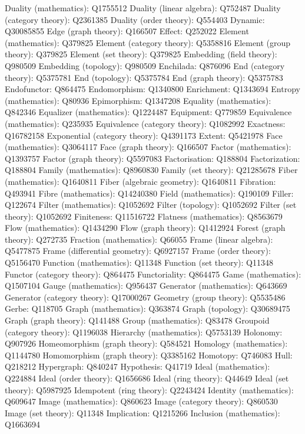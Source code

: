 Duality (mathematics): Q1755512
Duality (linear algebra): Q752487
Duality (category theory): Q2361385
Duality (order theory): Q554403
Dynamic: Q30085855
Edge (graph theory): Q166507
Effect: Q252022
Element (mathematics): Q379825
Element (category theory): Q5358816
Element (group theory): Q379825
Element (set theory): Q379825
Embedding (field theory): Q980509
Embedding (topology): Q980509
Enchilada: Q876096
End (category theory): Q5375781
End (topology): Q5375784
End (graph theory): Q5375783
Endofunctor: Q864475
Endomorphism: Q1340800
Enrichment: Q1343694
Entropy (mathematics): Q80936
Epimorphism: Q1347208
Equality (mathematics): Q842346
Equalizer (mathematics): Q1224487
Equipment: Q779859
Equivalence (mathematics): Q235935
Equivalence (category theory): Q1082992
Exactness: Q16782158
Exponential (category theory): Q4391173
Extent: Q5421978
Face (mathematics): Q3064117
Face (graph theory): Q166507
Factor (mathematics): Q1393757
Factor (graph theory): Q5597083
Factorisation: Q188804
Factorization: Q188804
Family (mathematics): Q8960830
Family (set theory): Q21285678
Fiber (mathematics): Q1640811
Fiber (algebraic geometry): Q1640811
Fibration: Q493941
Fibre (mathematics): Q14240380
Field (mathematics): Q190109
Filler: Q122674
Filter (mathematics): Q1052692
Filter (topology): Q1052692
Filter (set theory): Q1052692
Finiteness: Q11516722
Flatness (mathematics): Q8563679
Flow (mathematics): Q1434290
Flow (graph theory): Q1412924
Forest (graph theory): Q272735
Fraction (mathematics): Q66055
Frame (linear algebra): Q5477875
Frame (differential geometry): Q6927157
Frame (order theory): Q5156470
Function (mathematics): Q11348
Function (set theory): Q11348
Functor (category theory): Q864475
Functoriality: Q864475
Game (mathematics): Q1507104
Gauge (mathematics): Q956437
Generator (mathematics): Q643669
Generator (category theory): Q17000267
Geometry (group theory): Q5535486
Gerbe: Q118705
Graph (mathematics): Q363874
Graph (topology): Q30689475
Graph (graph theory): Q141488
Group (mathematics): Q83478
Groupoid (category theory): Q1196038
Hierarchy (mathematics): Q5753139
Holonomy: Q907926
Homeomorphism (graph theory): Q584521
Homology (mathematics): Q1144780
Homomorphism (graph theory): Q3385162
Homotopy: Q746083
Hull: Q218212
Hypergraph: Q840247
Hypothesis: Q41719
Ideal (mathematics): Q224884
Ideal (order theory): Q1656686
Ideal (ring theory): Q44649
Ideal (set theory): Q5987925
Idempotent (ring theory): Q2243424
Identity (mathematics): Q609647
Image (mathematics): Q860623
Image (category theory): Q860530
Image (set theory): Q11348
Implication: Q1215266
Inclusion (mathematics): Q1663694
